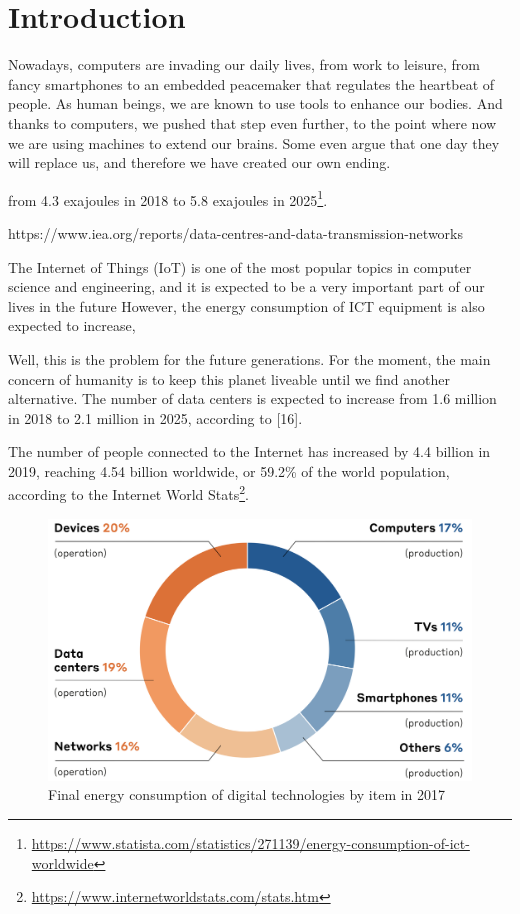 \newpage

\chapter{Introduction }

\label{chapter:introduction}

Nowadays, computers are invading our daily lives, from work to leisure, from fancy smartphones to an embedded peacemaker that regulates the heartbeat of people.
As human beings, we are known to use tools to enhance our bodies. And thanks to computers, we pushed that step even further, to the point where now we are using machines to extend our brains. Some even argue that one day they will replace us, and therefore we have created our own ending.


from 4.3 exajoules in 2018 to 5.8 exajoules in 2025\footnote{\url{https://www.statista.com/statistics/271139/energy-consumption-of-ict-worldwide}}.


https://www.iea.org/reports/data-centres-and-data-transmission-networks

The Internet of Things (IoT) is one of the most popular topics in computer science and engineering, and it is expected to be a very important part of our lives in the future
However, the energy consumption of ICT equipment is also expected to increase,

Well, this is the problem for the future generations. For the moment, the main concern of humanity is to keep this planet liveable until we find another alternative.
The number of data centers is expected to increase from 1.6 million in 2018 to 2.1 million in 2025, according to [16].

The number of people connected to the Internet has increased by 4.4 billion in 2019, reaching 4.54 billion worldwide, or 59.2\% of the world population, according to the Internet World Stats\footnote{\url{https://www.internetworldstats.com/stats.htm}}.

\begin{figure}
    \includegraphics[width=\linewidth]{chapters/distribution_of_ict_consumption.png}
    \caption{Final energy consumption of digital technologies by item in 2017}
    \label{fig:distribution_of_ict_consumption}
\end{figure}

